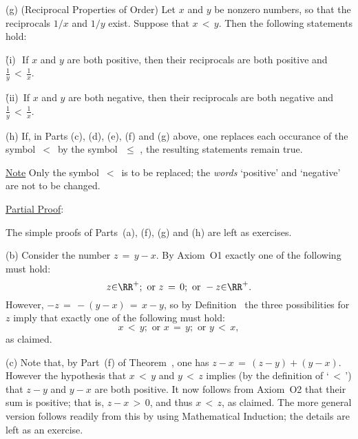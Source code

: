 \V

        (g) (Reciprocal Properties of Order) Let $x$ and $y$ be nonzero numbers, so that the reciprocals $1/x$ and $1/y$ exist. Suppose that $x\,<\,y$.
    Then the following statements hold:

         \h (i)\,\, If $x$ and $y$ are both positive, then their reciprocals are both positive and ${\displaystyle \frac{1}{y}\,<\,\frac{1}{x}}$.

         \h (ii)\, If $x$ and $y$ are both negative, then their reciprocals are both negative and ${\displaystyle \frac{1}{y}\,<\,\frac{1}{x}}$.

\V

        (h) If, in Parts (c), (d), (e), (f) and (g) above, one replaces each occurance of the symbol $\,<\,$ by the symbol $\,\,{\leq}\,\,$,
    the resulting statements remain true.

    \underline{Note} Only the symbol $\,<\,$ is to be replaced; the {\em words} `positive' and `negative' are not to be changed.

\V

        \underline{Partial Proof}:

\V

        The simple proofs of Parts~(a), (f), (g) and (h) are left as exercises. %

        (b) Consider the number $z \,=\, y-x$. By Axiom~O1 exactly one of the following must hold:
        \begin{displaymath}
        z{\in}{\RR}^{+}; \mbox{ or } z \,=\, 0; \mbox{ or } -z{\in}{\RR}^{+}.
        \end{displaymath}
    However, $-z \,=\, -(y-x) \,=\, x-y$, so by Definition~ the three possibilities for $z$ imply that exactly one of the following must hold:
        \begin{displaymath}
        x\,<\,y; \mbox{ or } x \,=\, y; \mbox{ or } y\,<\,x,
        \end{displaymath}
    as claimed.

\V

        (c) Note that, by Part~(f) of Theorem~, one has $z-x \,=\, (z-y)+(y-x)$. However the hypothesis that $x\,<\,y$ and $y\,<\,z$ implies (by the definition of `$\,<\,$') that $z-y$ and $y-x$ are both positive.
    It now follows from Axiom~O2 that their sum is positive; that is, $z-x\,>\,0$, and thus $x\,<\,z$, as claimed.
    The more general version follows readily from this by using Mathematical Induction; the details are left as an exercise.

